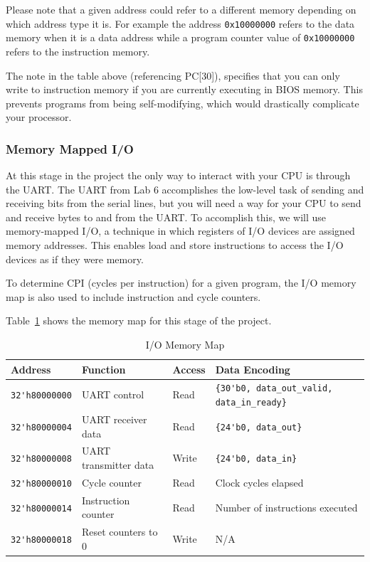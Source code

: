 \documentclass[11pt]{article}
\begin{document}
Please note that a given address could refer to a different memory depending on which address type it is.
For example the address \verb|0x10000000| refers to the data memory when it is a data address while a program counter value of \verb|0x10000000| refers to the instruction memory.

The note in the table above (referencing PC[30]), specifies that you can only write to instruction memory if you are currently executing in BIOS memory.
This prevents programs from being self-modifying, which would drastically complicate your processor.

\subsubsection{Memory Mapped I/O}
\label{mmio}
At this stage in the project the only way to interact with your CPU is through the UART.
The UART from Lab 6 accomplishes the low-level task of sending and receiving bits from the serial lines, but you will need a way for your CPU to send and receive bytes to and from the UART.
To accomplish this, we will use memory-mapped I/O, a technique in which registers of I/O devices are assigned memory addresses.
This enables load and store instructions to access the I/O devices as if they were memory.

To determine CPI (cycles per instruction) for a given program, the I/O memory map is also used to include instruction and cycle counters.

Table~\ref{mem_map1} shows the memory map for this stage of the project.

\begin{table}[hbt]
  \begin{center}
    \caption{I/O Memory Map}
    \label{mem_map1}
    \begin{tabular}{l l l l}
      \toprule
      \textbf{Address} & \textbf{Function} & \textbf{Access} & \textbf{Data Encoding}\\
      \midrule
      \verb|32'h80000000| & UART control & Read & \verb|{30'b0, data_out_valid, data_in_ready}| \\
      \verb|32'h80000004| & UART receiver data & Read & \verb|{24'b0, data_out}| \\
      \verb|32'h80000008| & UART transmitter data & Write & \verb|{24'b0, data_in}| \\
      \midrule
      \verb|32'h80000010| & Cycle counter & Read & Clock cycles elapsed \\
      \verb|32'h80000014| & Instruction counter & Read & Number of instructions executed \\
      \verb|32'h80000018| & Reset counters to 0 & Write & N/A \\
      \bottomrule
    \end{tabular}
  \end{center}
\end{table}
\end{document}
